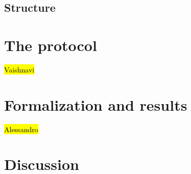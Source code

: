 \documentclass[runningheads]{llncs}
\begin{document}
\subsection{Structure}
\label{sec:structure}

\section{The \mEdhoc protocol}
\label{sec:edhoc}
\hl{Vaishnavi}


\section{Formalization and results}
\label{sec:formalization}
\hl{Alessandro}


\section{Discussion}
\label{sec:discussion}
\end{document}
